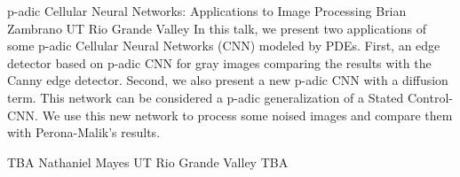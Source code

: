 \begin{addmargin}[2em]{0em}
\vspace{1.5ex}
\abs
{p-adic Cellular Neural Networks: Applications to Image Processing}
{Brian Zambrano}
{UT Rio Grande Valley}
{In this talk, we present two applications of some p-adic Cellular Neural Networks (CNN) modeled by PDEs. First, an edge detector based on p-adic CNN for gray images comparing the results with the Canny edge detector. Second, we also present a new p-adic CNN with a diffusion term. This network can be considered a p-adic generalization of a Stated Control- CNN.   We use this new network to process some noised images and compare them with Perona-Malik’s results.}


\vspace{1.5ex}
\abs
{TBA}
{Nathaniel Mayes}
{UT Rio Grande Valley}
{TBA}
\end{addmargin}




